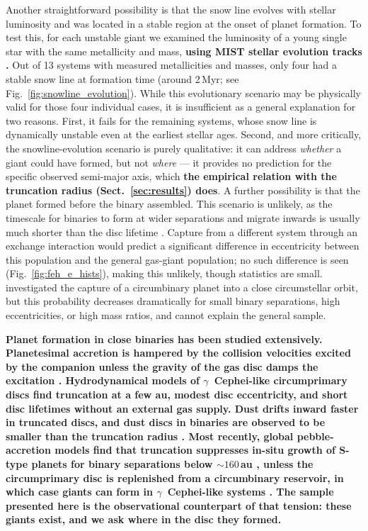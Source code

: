 \documentclass{aa}
\newcommand{\rev}[1]{{\color{red}\textbf{#1}}}
\begin{document}
Another straightforward possibility is that the snow line evolves with
stellar luminosity and was located in a stable region at the onset of
planet formation. To test this, for each unstable giant we examined the
luminosity of a young single star with the same metallicity and mass,
\rev{using MIST stellar evolution tracks \citep[built with MESA;][]{Choi2016,
Paxton2011, Jermyn2023}.} Out of 13 systems with
measured metallicities and masses, only four had a stable snow line at
formation time (around 2\,Myr; see Fig.~\ref{fig:snowline_evolution}).
While this evolutionary scenario may be physically valid for those four
individual cases, it is insufficient as a general explanation for two
reasons. First, it fails for the remaining systems, whose snow line is
dynamically unstable even at the earliest stellar ages. Second, and more
critically, the snowline-evolution scenario is purely qualitative: it
can address \emph{whether} a giant could have formed, but not
\emph{where} --- it provides no prediction for the specific observed
semi-major axis, which \rev{the empirical relation with the truncation
radius (Sect.~\ref{sec:results}) does}.
A further possibility is that the planet formed before the binary
assembled. This scenario is unlikely, as the timescale for binaries to
form at wider separations and migrate inwards is usually much shorter
than the disc lifetime \citep[e.g.][]{Generozov2025}. Capture from a
different system through an exchange interaction would predict a
significant difference in eccentricity between this population and the
general gas-giant population; no such difference is seen
(Fig.~\ref{fig:feh_e_hists}), making this unlikely, though statistics
are small. \citet{Gong2018} investigated the capture of a circumbinary
planet into a close circumstellar orbit, but this probability decreases
dramatically for small binary separations, high eccentricities, or high
mass ratios, and cannot explain the general sample.

\rev{Planet formation in close binaries has been studied extensively.
Planetesimal accretion is hampered by the collision velocities excited by
the companion \citep{Thebault2006, Paardekooper2008} unless the gravity
of the gas disc damps the excitation \citep{Rafikov2013, Silsbee2015,
Silsbee2021}. Hydrodynamical models of $\gamma$~Cephei-like circumprimary
discs \citep{Kley2008, Muller2012, Jordan2021, Marzari2025b} find
truncation at a few au, modest disc eccentricity, and short disc
lifetimes without an external gas supply. Dust drifts inward faster in
truncated discs, and dust discs in binaries are observed to be smaller
than the truncation radius \citep{Zagaria2021, Zagaria2021b}. Most
recently, global pebble-accretion models find that truncation suppresses
in-situ growth of S-type planets for binary separations below
$\sim160$\,au \citep{Venturini2026}, unless the circumprimary disc is
replenished from a circumbinary reservoir, in which case giants can form
in $\gamma$~Cephei-like systems \citep{Ronco2026}. The sample presented
here is the observational counterpart of that tension: these giants
exist, and we ask where in the disc they formed.}
\end{document}
